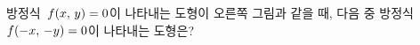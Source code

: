 \noindent\begin{minipage}[t]{0.58\linewidth}\vspace{0pt}\raggedright 방정식~$f(x,\mkern3mu y)=0$이 나타내는 도형이 오른쪽 그림과 같을 때, 다음 중 방정식~$f(-x,\mkern3mu -y)=0$이 나타내는 도형은?\end{minipage}\hfill\begin{minipage}[t]{0.4\linewidth}\vspace{0pt}\centering \resizebox{\ifdim\width>\linewidth\linewidth\else\width\fi}{!}{}\end{minipage}\par
\begin{choicesii}{}{}{}{}{}\end{choicesii}
